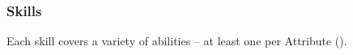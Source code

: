 \subsubsection*{Skills}

Each skill covers a variety of abilities -- at least one per Attribute ().
